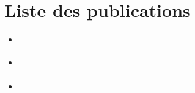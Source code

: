 \newpage
\section*{Liste des publications}

\begin{itemize}
	\item {} \cite{Rajaona2014}
	\item {} \cite{Rajaona2015}
	\item {} \cite{Rajaona2016}
\end{itemize}